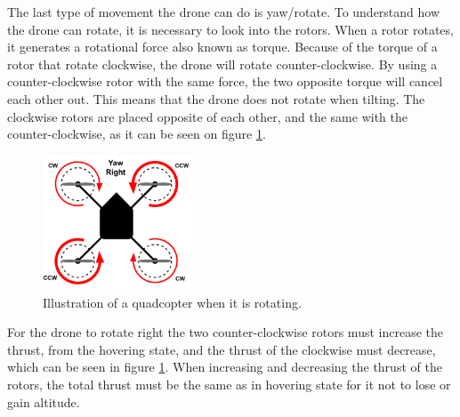 The last type of movement the drone can do is yaw/rotate. To understand how the drone can rotate, it is necessary to look into the rotors. When a rotor rotates, it generates a rotational force also known as torque. Because of the torque of a rotor that rotate clockwise, the drone will rotate counter-clockwise. By using a counter-clockwise rotor with the same force, the two opposite torque will cancel each other out\cite{PhysicsofDroneFlight}. This means that the drone does not rotate when tilting. The clockwise rotors are placed opposite of each other, and the same with the counter-clockwise, as it can be seen on figure \ref{fig:dronePhysics_4}.
\newline
\begin{figure}[H]
    \centering
    \includegraphics[width=0.4\textwidth]{figures/ch_intro/physics-of-multirotor-4.png}
    \caption{Illustration of a quadcopter when it is rotating.}
    \label{fig:dronePhysics_4}
\end{figure}
For the drone to rotate right the two counter-clockwise rotors must increase the thrust, from the hovering state, and the thrust of the clockwise must decrease, which can be seen in figure \ref{fig:dronePhysics_4}. When increasing and decreasing the thrust of the rotors, the total thrust must be the same as in hovering state for it not to lose or gain altitude. 